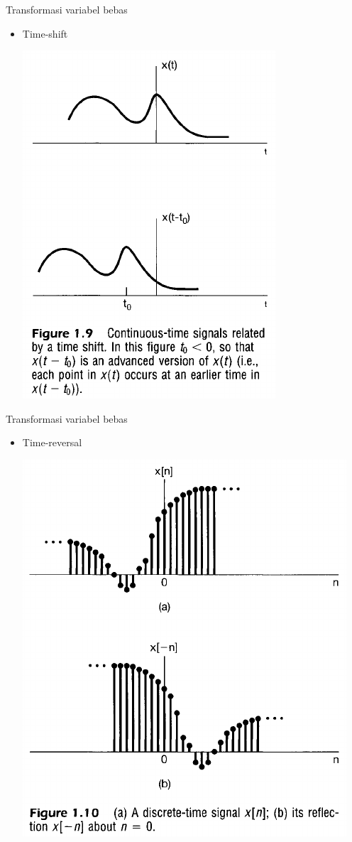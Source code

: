\documentclass[pdflatex,compress,mathserif]{beamer}
\begin{document}
\begin{frame}{Transformasi variabel bebas}
	\begin{itemize}
		\item Time-shift
		\begin{center}
			\includegraphics[width=0.4\linewidth]{img/img19}
		\end{center}
	\end{itemize}
\end{frame}

\begin{frame}{Transformasi variabel bebas}
	\begin{itemize}
		\item Time-reversal
		\begin{center}
			\includegraphics[width=0.4\linewidth]{img/img20}
		\end{center}
	\end{itemize}
\end{frame}
\end{document}

